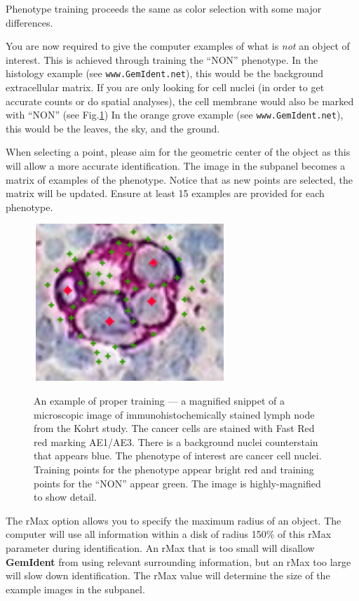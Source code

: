 \documentclass[12pt]{article}
\begin{document}
Phenotype training proceeds the same as color selection with some major differences.

You are now required to give the computer examples of what is {\emph{not}} an object of interest. This is achieved through training the ``NON'' phenotype. In the histology example (see {\tt www.GemIdent.net}), this would be the background extracellular matrix. If you are only looking for cell nuclei (in order to get accurate counts or do spatial analyses), the cell membrane would also be marked with ``NON'' (see Fig.\ref{fig:histology}) In the orange grove example (see {\tt www.GemIdent.net}), this would be the leaves, the sky, and the ground.

When selecting a point, please aim for the  geometric center of the object as this will allow a more accurate identification. The image in the subpanel becomes a matrix of examples of the phenotype. Notice that as new points are selected, the matrix will be updated. Ensure at least 15 examples are provided for each phenotype.

\begin{figure}[htp]
\centering
\includegraphics[width=206pt,height=168pt]{histology.jpg}
\label{fig:histology}
\caption{\sf An example of proper training --- a magnified snippet of a microscopic image of immunohistochemically stained lymph node from the Kohrt study\cite{kohrt}. The cancer cells are stained with Fast Red red marking AE1/AE3. There is a background nuclei counterstain that appears blue. The phenotype of interest are cancer cell nuclei. Training points for the phenotype appear bright red and training points for the ``NON'' appear green. The image is highly-magnified to show detail.}
\end{figure}

The {\sf rMax} option allows you to specify the maximum radius of an object. The computer will use all information within a disk of radius 150\% of this rMax 
parameter
during identification. An rMax that is too small will disallow {\bf GemIdent} from using relevant surrounding information, but an rMax too large will slow down identification. The {\sf rMax} value will determine the size of the example images in the subpanel.
\end{document}
